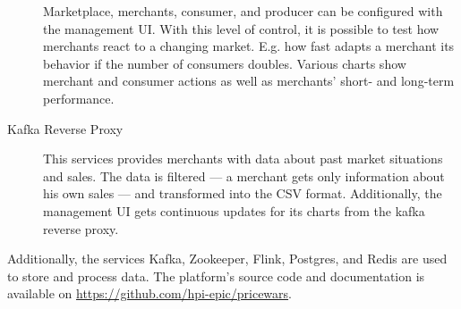 \begin{description}
		Marketplace, merchants, consumer, and producer can be configured with the management UI.
		With this level of control, it is possible to test how merchants react to a changing market. E.g. how fast adapts a merchant its behavior if the number of consumers doubles.
		Various charts show merchant and consumer actions as well as merchants' short- and long-term performance.
	\item [Kafka Reverse Proxy]
		This services provides merchants with data about past market situations and sales.
		The data is filtered --- a merchant gets only information about his own sales --- and transformed into the CSV format.
		Additionally, the management UI gets continuous updates for its charts from the kafka reverse proxy.
		
\end{description}

Additionally, the services Kafka, Zookeeper, Flink, Postgres, and Redis are used to store and process data.
The platform's source code and documentation is available on \url{https://github.com/hpi-epic/pricewars}.
